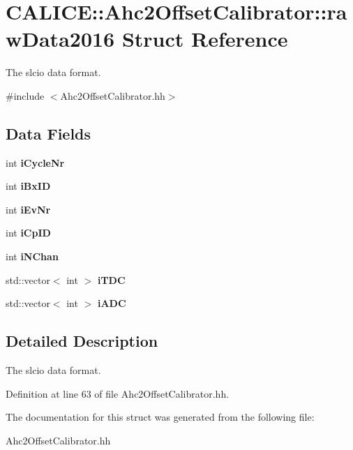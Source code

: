\section{CALICE::Ahc2OffsetCalibrator::rawData2016 Struct Reference}
\label{structCALICE_1_1Ahc2OffsetCalibrator_1_1rawData2016}


The slcio data format.  


{\ttfamily \#include $<$Ahc2OffsetCalibrator.hh$>$}\subsection*{Data Fields}
\begin{DoxyCompactItemize}
\item 
int {\bfseries iCycleNr}\label{structCALICE_1_1Ahc2OffsetCalibrator_1_1rawData2016_a2b72d43c0388a78a601acb429e3d482b}

\item 
int {\bfseries iBxID}\label{structCALICE_1_1Ahc2OffsetCalibrator_1_1rawData2016_ac4d4e2f69d4b52fdc8e220fb975cf745}

\item 
int {\bfseries iEvNr}\label{structCALICE_1_1Ahc2OffsetCalibrator_1_1rawData2016_acc1cfe18b3a11deb2decfd0457242ff2}

\item 
int {\bfseries iCpID}\label{structCALICE_1_1Ahc2OffsetCalibrator_1_1rawData2016_acc230b86c79374060686e4ae899084a2}

\item 
int {\bfseries iNChan}\label{structCALICE_1_1Ahc2OffsetCalibrator_1_1rawData2016_a7798943a63a125403bcaf6caad9739a8}

\item 
std::vector$<$ int $>$ {\bfseries iTDC}\label{structCALICE_1_1Ahc2OffsetCalibrator_1_1rawData2016_af512f3a9a6faa0a315ff5338a5cf04e1}

\item 
std::vector$<$ int $>$ {\bfseries iADC}\label{structCALICE_1_1Ahc2OffsetCalibrator_1_1rawData2016_ae943a29e5b603cd3f83cd6a4021bedfd}

\end{DoxyCompactItemize}


\subsection{Detailed Description}
The slcio data format. 

Definition at line 63 of file Ahc2OffsetCalibrator.hh.

The documentation for this struct was generated from the following file:\begin{DoxyCompactItemize}
\item 
Ahc2OffsetCalibrator.hh\end{DoxyCompactItemize}
